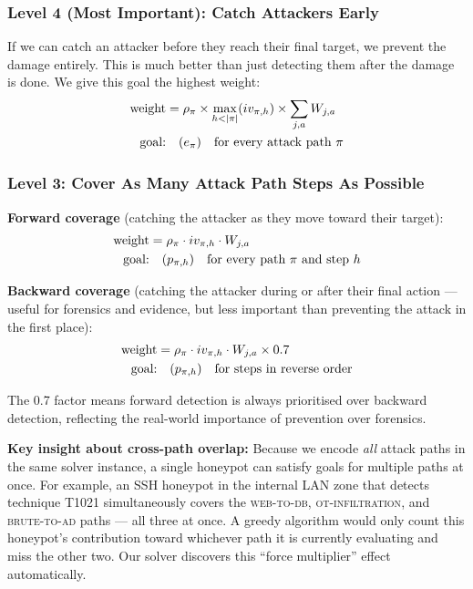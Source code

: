 \documentclass[journal]{IEEEtran}
\begin{document}
\subsubsection{Level 4 (Most Important): Catch Attackers Early}
If we can catch an attacker before they reach their final target,
we prevent the damage entirely. This is much better than just
detecting them after the damage is done. We give this goal the
highest weight:
\begin{align}
  \text{weight} &= \rho_\pi \times
    \max_{h < |\pi|}(iv_{\pi,h}) \times
    \sum_{j,a} W_{j,a} \notag \\
  \text{goal:} &\quad (e_\pi) \quad \text{for every attack path } \pi
\end{align}

\subsubsection{Level 3: Cover As Many Attack Path Steps As Possible}

\textbf{Forward coverage} (catching the attacker as they move
toward their target):
\begin{align}
  \text{weight} &= \rho_\pi \cdot iv_{\pi,h} \cdot W_{j,a} \notag \\
  \text{goal:} &\quad (p_{\pi,h})
    \quad \text{for every path } \pi \text{ and step } h
\end{align}

\textbf{Backward coverage} (catching the attacker during or after
their final action --- useful for forensics and evidence, but less
important than preventing the attack in the first place):
\begin{align}
  \text{weight} &= \rho_\pi \cdot iv_{\pi,h} \cdot W_{j,a} \times 0.7 \notag \\
  \text{goal:} &\quad (p_{\pi,h})
    \quad \text{for steps in reverse order}
\end{align}

The 0.7 factor means forward detection is always prioritised over
backward detection, reflecting the real-world importance of
prevention over forensics.

\noindent\textbf{Key insight about cross-path overlap:}
Because we encode \emph{all} attack paths in the same solver
instance, a single honeypot can satisfy goals for multiple paths
at once. For example, an SSH honeypot in the internal LAN zone
that detects technique T1021 simultaneously covers the
\textsc{web-to-db}, \textsc{ot-infiltration}, and
\textsc{brute-to-ad} paths --- all three at once. A greedy
algorithm would only count this honeypot's contribution toward
whichever path it is currently evaluating and miss the other two.
Our solver discovers this ``force multiplier'' effect automatically.
\end{document}
